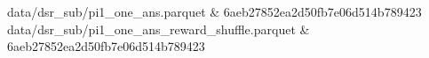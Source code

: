         data/dsr\_sub/pi1\_one\_ans.parquet & 6aeb27852ea2d50fb7e06d514b789423 \\
        data/dsr\_sub/pi1\_one\_ans\_reward\_shuffle.parquet & 6aeb27852ea2d50fb7e06d514b789423 \\
